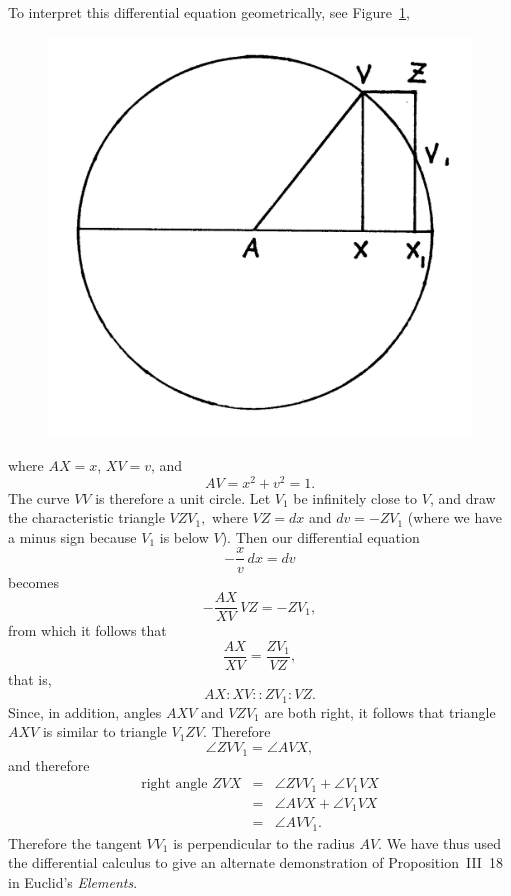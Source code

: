 \documentclass[polutonikogreek,english,twoside,openright]{article}
\begin{document}
\begin{enumerate}
To interpret this differential equation geometrically, see
Figure~\ref{circex},
\begin{figure}[htp]
\begin{center}
\includegraphics[width=.5\textwidth]{fig/Figure11A}
\caption{}
\label{circex}
\vspace{-10pt}
\end{center}
\end{figure}
where $AX = x$, $XV = v$, and 
$$AV = x^2 + v^2 =1.$$
The curve $VV$ is therefore a unit circle.  Let $V_1$ be infinitely
close to $V$, and draw the characteristic triangle $VZV_1,$ where
$VZ = dx$ and $dv = -ZV_1$ (where we have a minus sign because $V_1$
is below $V$).  Then our differential equation
$$-\frac{x}{v}\,dx = dv$$
becomes
$$-\frac{AX}{XV}\,VZ = - ZV_1,$$
from which it follows that
$$\frac{AX}{XV} = \frac{ZV_1}{VZ},$$
that is,
$$ AX \!:\! XV :: ZV_1 \!:\! VZ.$$
Since, in addition, angles $AXV$ and $VZV_1$ are both right, it
follows that triangle $AXV$ is similar to triangle $V_1ZV$.  Therefore
$$\angle ZVV_1 = \angle AVX,$$
and therefore
\begin{eqnarray*}
\mbox{right angle }ZVX & = & \angle ZVV_1 + \angle V_1VX\\
& = & \angle AVX + \angle V_1VX\\
& = & \angle AVV_1.
\end{eqnarray*}
Therefore the tangent $VV_1$ is perpendicular to the radius $AV$.  We
have thus used the differential calculus to give an alternate
demonstration of Proposition~III~18 in Euclid's {\em Elements}.



\end{enumerate}
\end{document}
